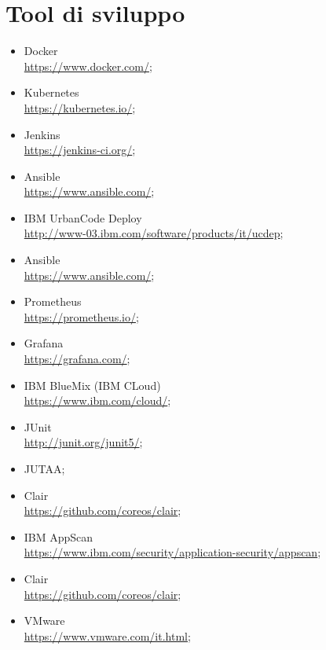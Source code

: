 \section{Tool di sviluppo}
\begin{itemize}
 \item Docker \\
\href{https://www.docker.com/}{https://www.docker.com/};
 \item Kubernetes\\
\href{https://kubernetes.io/}{https://kubernetes.io/};
 \item Jenkins\\
\href{https://jenkins-ci.org/}{https://jenkins-ci.org/};
 \item Ansible\\
\href{https://www.ansible.com/}{https://www.ansible.com/};
\item IBM UrbanCode Deploy\\
\href{http://www-03.ibm.com/software/products/it/ucdep}{http://www-03.ibm.com/software/products/it/ucdep};
\item Ansible\\
\href{https://www.ansible.com/}{https://www.ansible.com/};
\item Prometheus\\
\href{https://prometheus.io/}{https://prometheus.io/};
\item Grafana\\
\href{https://grafana.com/}{https://grafana.com/};
\item IBM BlueMix (IBM CLoud)\\
\href{https://www.ibm.com/cloud/}{https://www.ibm.com/cloud/};
\item JUnit\\
\href{http://junit.org/junit5/}{http://junit.org/junit5/};
\item JUTAA;\\
\item Clair\\
\href{https://github.com/coreos/clair}{https://github.com/coreos/clair};
\item IBM AppScan\\
\href{https://www.ibm.com/security/application-security/appscan}{https://www.ibm.com/security/application-security/appscan};
\item Clair\\
\href{https://github.com/coreos/clair}{https://github.com/coreos/clair};
\item VMware\\
\href{https://www.vmware.com/it.html}{https://www.vmware.com/it.html};
\end{itemize}

